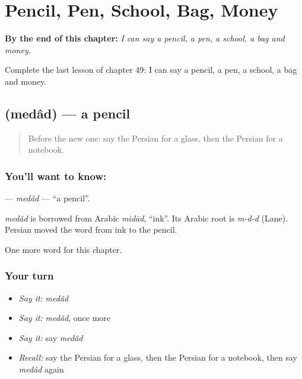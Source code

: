 
\chapter{Pencil, Pen, School, Bag, Money}
\label{ch:fa-pencil-pen-school-bag-money}

\begin{chapteropening}
\textbf{By the end of this chapter:} \emph{I can say a pencil, a pen, a school, a bag and money.}

Complete the last lesson of chapter 49: I can say a pencil, a pen, a school, a bag and money.
\end{chapteropening}

\section[\texorpdfstring{\fa{مداد} (medâd)}{مداد (medâd)}]{ (medâd) — a pencil}

\label{lesson:FA-C49-medad}



\begin{quote}
Before the new one: say the Persian for a glass, then the Persian for a notebook.
\end{quote}

\subsection*{You'll want to know: }
\textbf{} — \emph{medâd} — \textquotedblleft{}a pencil\textquotedblright{}.

\begin{cousinweb}
\emph{medâd} is borrowed from Arabic \emph{midād}, \textquotedblleft{}ink\textquotedblright{}. Its Arabic root is \emph{m-d-d} (Lane). Persian moved the word from ink to the pencil.
\end{cousinweb}

\begin{grammarlens}[title={What you've built}]
One more word for this chapter.
\end{grammarlens}

\subsection*{Your turn}
\begin{itemize}
\raggedright
  \item \emph{Say it:} \emph{medâd}
  \item \emph{Say it:} \emph{medâd}, once more
  \item \emph{Say it:} say \emph{medâd}
  \item \emph{Recall:} say the Persian for a glass, then the Persian for a notebook, then say \emph{medâd} again
\end{itemize}

